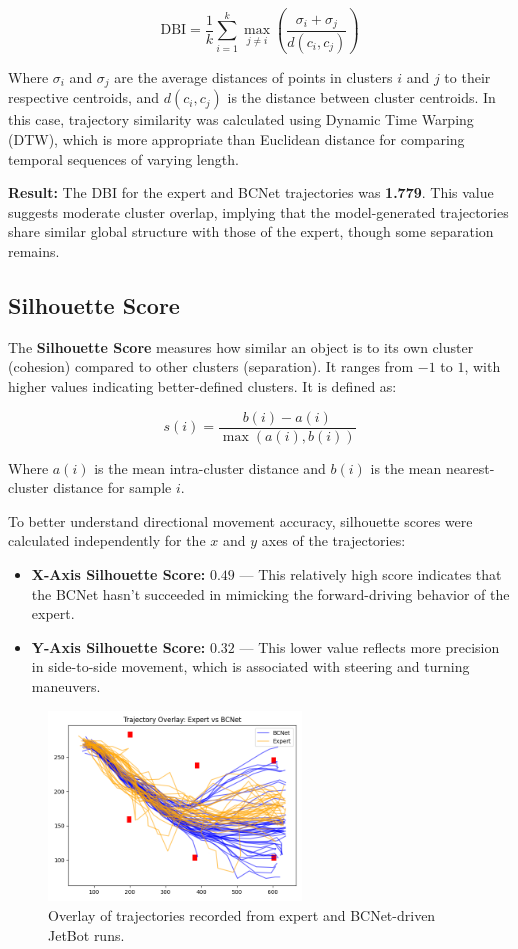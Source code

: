 \[
  \text{DBI} = \frac{1}{k} \sum_{i=1}^{k} \max_{j \ne i} \left( \frac{\sigma_i + \sigma_j}{d(c_i, c_j)} \right)
\]

Where $\sigma_i$ and $\sigma_j$ are the average distances of points in clusters $i$ and $j$ to their respective centroids, and $d(c_i, c_j)$ is the distance between cluster centroids. In this case, trajectory similarity was calculated using Dynamic Time Warping (DTW), which is more appropriate than Euclidean distance for comparing temporal sequences of varying length.

\textbf{Result:} The DBI for the expert and BCNet trajectories was \textbf{1.779}. This value suggests moderate cluster overlap, implying that the model-generated trajectories share similar global structure with those of the expert, though some separation remains.

\subsection{Silhouette Score}

The \textbf{Silhouette Score} \autocite{kaufman2009finding} measures how similar an object is to its own cluster (cohesion) compared to other clusters (separation). It ranges from $-1$ to $1$, with higher values indicating better-defined clusters. It is defined as:

\[
  s(i) = \frac{b(i) - a(i)}{\max(a(i), b(i))}
\]

Where $a(i)$ is the mean intra-cluster distance and $b(i)$ is the mean nearest-cluster distance for sample $i$.

To better understand directional movement accuracy, silhouette scores were calculated independently for the $x$ and $y$ axes of the trajectories:

\begin{itemize}
  \item \textbf{X-Axis Silhouette Score:} $0.49$ — This relatively high score indicates that the BCNet hasn't succeeded in mimicking the forward-driving behavior of the expert.
  \item \textbf{Y-Axis Silhouette Score:} $0.32$ — This lower value reflects more precision in side-to-side movement, which is associated with steering and turning maneuvers.
\end{itemize}

\begin{figure}[htbp]
  \centering
  \includegraphics[width=0.6\textwidth]{Images/Evaluation/trajectory_overlay.png}
  \caption{Overlay of trajectories recorded from expert and BCNet-driven JetBot runs.}
  \label{fig:trajectory_overlay}
\end{figure}

